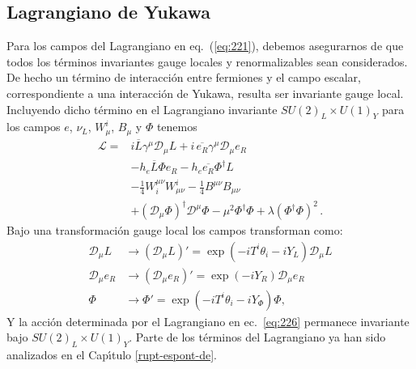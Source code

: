\subsection*{Lagrangiano de Yukawa}
Para los campos del Lagrangiano en eq.~(\ref{eq:221}), debemos asegurarnos de que todos los t\'erminos invariantes gauge locales y renormalizables sean considerados. De hecho un t\'ermino de interacci\'on entre fermiones y el campo escalar, correspondiente a una interacci\'on de Yukawa, resulta ser invariante gauge local. Incluyendo dicho t\'ermino en el Lagrangiano invariante $SU(2)_L\times U(1)_Y$ para los campos $e$, $\nu_L$, $W_\mu^i$, $B_\mu$ y $\Phi$ tenemos
\begin{align}
  \label{eq:226}
     \mathcal{L}=&i\overline{L}\gamma^\mu\mathcal{D}_\mu L+i\,\overline{e_R}\gamma^\mu\mathcal{D}_\mu e_R\nonumber\\
     &-h_e\overline{L}\Phi e_R-h_e\overline{e_R}\Phi^\dagger L\nonumber\\
     &-\tfrac{1}{4}W^{\mu\nu}_i W_{\mu\nu}^i-\tfrac{1}{4}B^{\mu\nu} B_{\mu\nu}\nonumber\\
     &+(\mathcal{D}_\mu\Phi)^\dagger\mathcal{D}^\mu\Phi-\mu^2\Phi^\dagger\Phi+\lambda(\Phi^\dagger\Phi)^2\,.
\end{align}
Bajo una transformaci\'on gauge local los campos transforman como:
\begin{align}
  \mathcal{D}_\mu L&\to\left(\mathcal{D}_\mu L\right)'=\exp\left(-iT^i\theta_i-iY_L\right)\mathcal{D}_\mu L\nonumber\\
  \mathcal{D}_\mu e_R&\to\left(\mathcal{D}_\mu e_R\right)'=\exp\left(-iY_R\right)\mathcal{D}_\mu e_R\nonumber\\
  \Phi&\to\Phi'=\exp\left(-iT^i\theta_i-iY_\Phi\right)\Phi,
\end{align}
Y la acci\'on determinada por el Lagrangiano en ec.~\eqref{eq:226} permanece invariante bajo $SU(2)_L\times U(1)_Y$. Parte de los t\'erminos del Lagrangiano ya han sido analizados en el Cap\'\i tulo \ref{rupt-espont-de}. 

